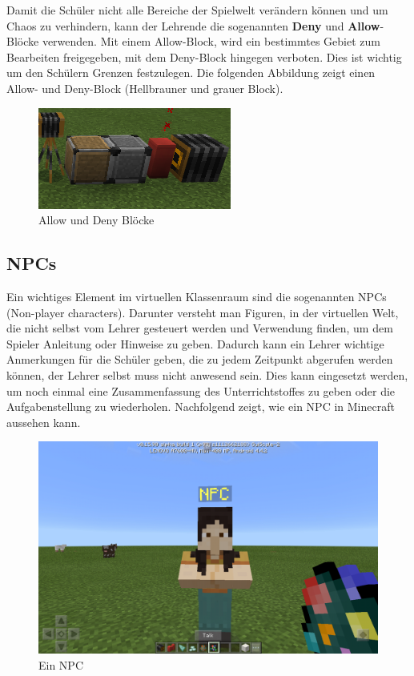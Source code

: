 Damit die Schüler nicht alle Bereiche der Spielwelt verändern können und um Chaos zu verhindern, kann der Lehrende die sogenannten \textbf{Deny} und \textbf{Allow}-Blöcke verwenden. Mit einem Allow-Block, wird ein bestimmtes Gebiet zum Bearbeiten freigegeben, mit dem Deny-Block hingegen verboten. Dies ist wichtig um den Schülern Grenzen festzulegen.
Die folgenden Abbildung zeigt einen Allow- und Deny-Block (Hellbrauner und grauer Block).

\begin{figure}[ht]
	\centering
	\includegraphics{images/AllowAndDenyBlocks.png}
	\caption{Allow und Deny Blöcke \cite{GamepediaMinecraft}}
	\label{allowDenyBlocks}
\end{figure}

\subsection{NPCs}

Ein wichtiges Element im virtuellen Klassenraum sind die sogenannten NPCs (Non-player characters).
Darunter versteht man Figuren, in der virtuellen Welt, die nicht selbst vom Lehrer gesteuert werden und Verwendung finden, um dem Spieler Anleitung oder Hinweise zu geben. Dadurch kann ein Lehrer wichtige Anmerkungen für die Schüler geben, die zu jedem Zeitpunkt abgerufen werden können, der Lehrer selbst muss nicht anwesend sein.
Dies kann eingesetzt werden, um noch einmal eine Zusammenfassung des Unterrichtstoffes zu geben oder die Aufgabenstellung zu wiederholen. Nachfolgend zeigt, wie ein NPC in Minecraft aussehen kann.

\begin{figure}[ht]
	\centering
	\includegraphics[width=\textwidth,height=\textheight,keepaspectratio]{images/NPC.png}
	\caption{Ein NPC \cite{GamepediaMinecraft}}
	\label{npc}
\end{figure}

